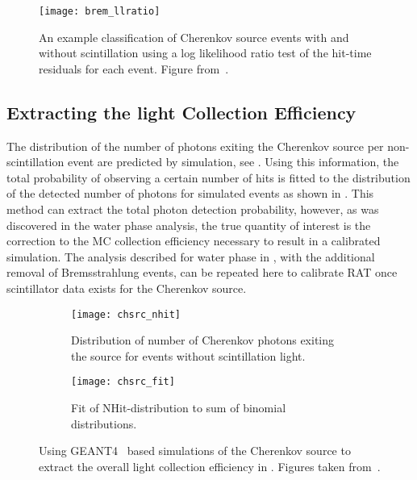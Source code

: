 \begin{figure}
\centering
\texttt{[image: brem\_llratio]}
\caption{\label{fig:brem_llratio} An example classification of Cherenkov source events with and without scintillation using a log likelihood ratio test of the hit-time residuals for each event. Figure from~\cite{Heintzelman:2013}.}
\end{figure}


\subsection{Extracting the light Collection Efficiency}
The distribution of the number of photons exiting the Cherenkov source per non-scintillation event are predicted by simulation, see . 
Using this information, the total probability of observing a certain number of hits is fitted to the distribution of the detected number of photons for simulated events as shown in .
This method can extract the total photon detection probability, however, as was discovered in the water phase analysis, the true quantity of interest is the correction to the MC collection efficiency necessary to result in a calibrated simulation.
The analysis described for water phase in , with the additional removal of Bremsstrahlung events, can be repeated here to calibrate RAT once scintillator data exists for the Cherenkov source.

\begin{figure}
\begin{subfigure}{.48\textwidth}
\texttt{[image: chsrc\_nhit]}
\caption{Distribution of number of Cherenkov photons exiting the source for events without scintillation light.}
\label{fig:nphotons}
\end{subfigure}
\hspace{0.5cm}
\begin{subfigure}{.48\textwidth}
\texttt{[image: chsrc\_fit]}
\caption{Fit of NHit-distribution to sum of binomial distributions.}
\label{fig:fit}
\end{subfigure}
\caption{Using GEANT4~\cite{geant4} based simulations of the Cherenkov source to extract the overall light collection efficiency in {\snop}. Figures taken from~\cite{Heintzelman:2013}. }
\label{fig:heintzelman-plots}
\end{figure}

